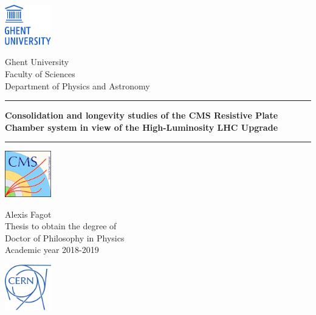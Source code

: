 \documentclass[10pt,a4paper,twoside,dutch,english,openright,leqno]{book}                %
\begin{document}
\latintext
\graphicspath{{fig/}}

% 
 \thispagestyle{empty}   %
% 
 \noindent
 \begin{minipage}{3cm}%
   \href{https://www.ugent.be/}{\includegraphics*[width=2cm]{UGent.pdf}}
 \end{minipage}\hfill
 \begin{minipage}{8cm}
 \raggedleft
 \textsf{Ghent University\\
 Faculty of Sciences\\
 Department of Physics and Astronomy}
 \end{minipage}
\vspace{2cm}
% 
\bigskip
 \hrule
 \vspace{5mm}
   \begin{centering}
     \LARGE \textbf{\textsf{Consolidation and longevity studies of the CMS Resistive Plate Chamber system in view of the High-Luminosity LHC Upgrade}}\\
   \end{centering}
 \vspace{5mm}
 \hrule
% 
 \vfill
 \begin{minipage}{2.0cm}%
     \href{https://cms.cern/}{\includegraphics*[width=2.0cm]{CMS.pdf}}
 \end{minipage}\hfill
 \begin{minipage}{7cm}
 \centering
 \LARGE\textsf{Alexis Fagot\\}
 \vspace{5mm}
 \normalsize\textsf{Thesis to obtain the degree of\\
 Doctor of Philosophy in Physics\\
 Academic year 2018-2019}
 \end{minipage}\hfill
 \begin{minipage}{2.0cm}%
     \href{https://home.cern/}{\includegraphics*[width=2.0cm]{CERN.pdf}}
 \end{minipage}\hfill
\end{document}
